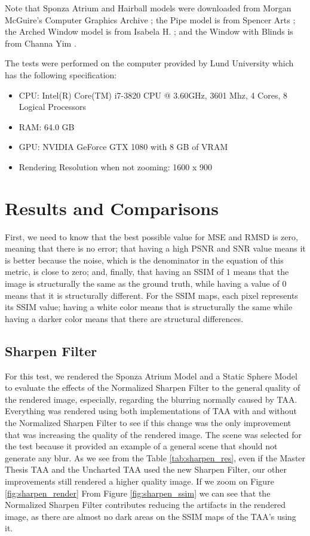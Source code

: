 \documentclass{cslthse-msc}
\begin{document}
Note that Sponza Atrium and Hairball models were downloaded from Morgan McGuire's Computer Graphics Archive \cite{McGuire2017Data}; the Pipe model is from Spencer Arts \cite{Spencer2010}; the Arched Window model is from Isabela H. \cite{Isabela2016}; and the Window with Blinds is from Channa Yim \cite{Channa2015}.

The tests were performed on the computer provided by Lund University which has the following specification:
\begin{itemize}
\setlength\itemsep{0em}
\item CPU: Intel(R) Core(TM) i7-3820 CPU @ 3.60GHz, 3601 Mhz, 4 Cores, 8 Logical Processors
\item RAM: 64.0 GB	
\item GPU: NVIDIA GeForce GTX 1080 with 8 GB of VRAM
\item Rendering Resolution when not zooming: 1600 x 900
\end{itemize}

\section{Results and Comparisons}
First, we need to know that the best possible value for MSE and RMSD is zero, meaning that there is no error; that having a high PSNR and SNR value means it is better because the noise, which is the denominator in the equation of this metric, is close to zero; and, finally, that having an SSIM of $1$ means that the image is structurally the same as the ground truth, while having a value of $0$ means that it is structurally different. For the SSIM maps, each pixel represents its SSIM value; having a white color means that is structurally the same while having a darker color means that there are structural differences.

\subsection{Sharpen Filter}
For this test, we rendered the Sponza Atrium Model and a Static Sphere Model to evaluate the effects of the Normalized Sharpen Filter to the general quality of the rendered image, especially, regarding the blurring normally caused by TAA. Everything was rendered using both implementations of TAA with and without the Normalized Sharpen Filter to see if this change was the only improvement that was increasing the quality of the rendered image. The scene was selected for the test because it provided an example of a general scene that should not generate any blur. As we see from the Table \ref{tab:sharpen_res}, even if the Master Thesis TAA and the Uncharted TAA used the new Sharpen Filter, our other improvements still rendered a higher quality image. If we zoom on Figure \ref{fig:sharpen_render} From Figure \ref{fig:sharpen_ssim} we can see that the Normalized Sharpen Filter contributes reducing the artifacts in the rendered image, as there are almost no dark areas on the SSIM maps of the TAA's using it.
\end{document}
